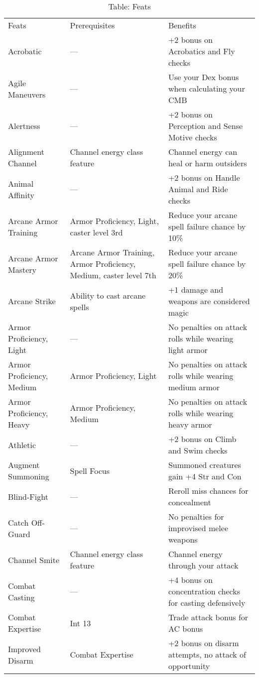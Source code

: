 \begin{table*}[]
\sffamily
\setlength{\tabcolsep}{1pt}
\caption{Table: Feats}
\begin{tabularx}{\linewidth}{lXl}
Feats & Prerequisites & Benefits\\
Acrobatic & --- & +2 bonus on Acrobatics and Fly checks \\
Agile Maneuvers & --- & Use your Dex bonus when calculating your CMB \\
Alertness & --- & +2 bonus on Perception and Sense Motive checks\\
Alignment Channel & Channel energy class feature & Channel energy can heal or harm outsiders\\
Animal Affinity & --- & +2 bonus on Handle Animal and Ride checks\\
Arcane Armor Training & Armor Proficiency, Light, caster level 3rd & Reduce your arcane spell failure chance by 10\%\\
\quad Arcane Armor Mastery & Arcane Armor Training, Armor Proficiency, Medium, caster level 7th & Reduce your arcane spell failure chance by 20\%\\
Arcane Strike & Ability to cast arcane spells & +1 damage and weapons are considered magic\\
Armor Proficiency, Light & --- & No penalties on attack rolls while wearing light armor\\
\quad Armor Proficiency, Medium & Armor Proficiency, Light & No penalties on attack rolls while wearing medium armor\\
\quad \quad Armor Proficiency, Heavy & Armor Proficiency, Medium & No penalties on attack rolls while wearing heavy armor\\
Athletic & --- & +2 bonus on Climb and Swim checks\\
Augment Summoning & Spell Focus & Summoned creatures gain +4 Str and Con\\
Blind-Fight & --- & Reroll miss chances for concealment\\
Catch Off-Guard & --- & No penalties for improvised melee weapons\\
Channel Smite & Channel energy class feature & Channel energy through your attack\\
Combat Casting & --- & +4 bonus on concentration checks for casting defensively\\
Combat Expertise & Int 13 & Trade attack bonus for AC bonus\\
\quad Improved Disarm & Combat Expertise & +2 bonus on disarm attempts, no attack of opportunity\\

\end{tabularx}
\end{table*}
